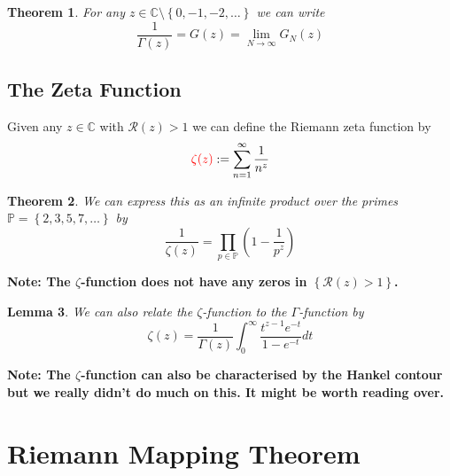 \documentclass[11pt]{article}
\newcommand{\defeq}{:=}
\newcommand{\C}{\mathbb{C}}
\newenvironment{defin}
	{\begin{mdframed}[backgroundcolor=white, roundcorner=5pt, linewidth=1pt]}
	{\end{mdframed}}
\newcommand{\mdf}[1]{{\color{red} #1}}
\newenvironment{note}
	{\begin{mdframed}[backgroundcolor=white, linecolor=red, roundcorner=5pt, linewidth=1pt]\bfseries{Note:}\normalfont}
	{\end{mdframed}}
\newtheorem{theorem}{Theorem}[section]
\newtheorem{lemma}[theorem]{Lemma}
\begin{document}
\begin{theorem}
For any $z\in\C\setminus\left\{0, -1, -2, \dots \right\}$ we can write
\[
	\frac{1}{\Gamma(z)}=G(z)=\lim_{N\to\infty}G_N(z)
\]
\end{theorem}

\subsection{The Zeta Function}
\begin{defin}
Given any $z\in\C$ with $\mathcal{R}(z)>1$ we can define the \mdf{Riemann zeta function} by
\[
	\mdf{\zeta(z)}\defeq\sum_{n=1}^{\infty}\frac{1}{n^z}
\]
\end{defin}

\begin{theorem}
We can express this as an infinite product over the primes $\mathbb{P}=\left\{2, 3, 5, 7, \dots\right\}$ by
\[
	\frac{1}{\zeta(z)}= \prod_{p\in\mathbb{P}}\left(1-\frac{1}{p^z}\right)
\]
\end{theorem}

\begin{note}
	The $\zeta$-function does not have any zeros in $\left\{\mathcal{R}(z)>1\right\}$.
\end{note}

\begin{lemma}
We can also relate the $\zeta$-function to the $\Gamma$-function by
\[
	\zeta(z)=\frac{1}{\Gamma(z)}\int_0^\infty\frac{t^{z-1}e^{-t}}{1-e^{-t}}dt
\]
\end{lemma}

\begin{note}
The $\zeta$-function can also be characterised by the Hankel contour but we really didn't do much on this.
It might be worth reading over.
\end{note}

\section{Riemann Mapping Theorem}
\end{document}
